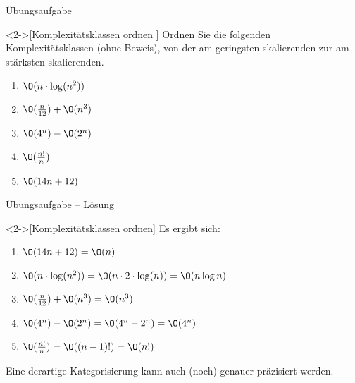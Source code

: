 \begin{frame}[fragile,c]{Übungsaufgabe}
    \begin{exercise}<2->[Komplexitätsklassen ordnen ]
        \pause{}Ordnen Sie die folgenden Komplexitätsklassen (ohne Beweis), von der am geringsten skalierenden zur am stärksten skalierenden.\pause{}
        \begin{multicols}{3}
            \begin{enumerate}[<+(1)->]\widei
                \item \(\O(n \cdot \log(n^2))\)
                \item \(\O(\frac{n}{12}) + \O(n^3)\)
                \item \(\O(4^n)-\O(2^n)\)
                \item \(\O(\frac{n!}{n})\)
                \item \(\O(14n+12)\)
            \end{enumerate}
        \end{multicols}
    \end{exercise}
\end{frame}

\begin{frame}[c]{Übungsaufgabe -- Lösung}
    \begin{solve}<2->[Komplexitätsklassen ordnen]
        \pause{}Es ergibt sich: \begin{enumerate}[<+(1)->]
            \item \(\O(14n+12) = \O(n)\)
            \item \(\O(n \cdot \log(n^2)) = \O(n \cdot 2 \cdot \log(n)) = \O(n \log n)\)
            \item \(\O(\frac{n}{12}) + \O(n^3) = \O(n^3)\)
            \item \(\O(4^n) - \O(2^n) = \O(4^n - 2^n) = \O(4^n)\)
            \item \(\O(\frac{n!}{n}) = \O((n-1)!) = \O(n!)\)
        \end{enumerate}
        \pause{}Eine derartige Kategorisierung kann auch (noch) genauer präzisiert werden.
    \end{solve}
\end{frame}

